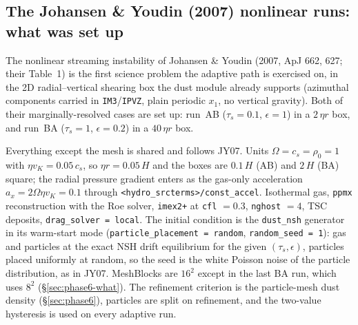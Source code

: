\documentclass[11pt]{article}
\newcommand{\code}[1]{\texttt{#1}}
\begin{document}
\subsection{The Johansen \& Youdin (2007) nonlinear runs: what was set up}
\label{sec:phase6-si}

The nonlinear streaming instability of Johansen \& Youdin (2007, ApJ 662, 627; their
Table~1) is the first science problem the adaptive path is exercised on, in the 2D
radial--vertical shearing box the dust module already supports (azimuthal components
carried in \code{IM3}/\code{IPVZ}, plain periodic $x_1$, no vertical gravity). Both of
their marginally-resolved cases are set up: run~AB ($\tau_s = 0.1$, $\epsilon = 1$) in a
$2\,\eta r$ box, and run~BA ($\tau_s = 1$, $\epsilon = 0.2$) in a $40\,\eta r$ box.

Everything except the mesh is shared and follows JY07. Units $\Omega = c_s = \rho_0 = 1$
with $\eta v_K = 0.05\,c_s$, so $\eta r = 0.05\,H$ and the boxes are $0.1\,H$ (AB) and
$2\,H$ (BA) square; the radial pressure gradient enters as the gas-only acceleration
$a_x = 2\Omega\eta v_K = 0.1$ through \code{<hydro\_srcterms>/const\_accel}. Isothermal gas,
\code{ppmx} reconstruction with the Roe solver, \code{imex2+} at \code{cfl} $= 0.3$,
\code{nghost} $= 4$, TSC deposits, \code{drag\_solver = local}. The initial condition is
the \code{dust\_nsh} generator in its warm-start mode
(\code{particle\_placement = random}, \code{random\_seed = 1}): gas and particles at the
exact NSH drift equilibrium for the given $(\tau_s,\epsilon)$, particles placed uniformly
at random, so the seed is the white Poisson noise of the particle distribution, as in
JY07. MeshBlocks are $16^2$ except in the last BA run, which uses $8^2$
(\S\ref{sec:phase6-what}). The refinement criterion is the particle-mesh
dust density (\S\ref{sec:phase6}), particles are split on refinement, and the two-value
hysteresis is used on every adaptive run.
\end{document}
